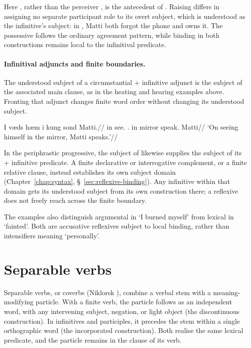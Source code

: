 Here , rather than the perceiver , is the antecedent of . Raising  differs in assigning no separate participant role to its overt subject, which is understood as the infinitive's subject: in , Matti both forgot the phone and owns it. The possessive follows the ordinary agreement pattern, while binding in both constructions remains local to the infinitival predicate.

\paragraph{Infinitival adjuncts and finite boundaries.}
The understood subject of a circumstantial  + infinitive adjunct is the subject of the associated main clause, as in the heating and hearing examples above. Fronting that adjunct changes finite word order without changing its understood subject.

\pex
\begingl
\gla I væds hæm i kung sond Matti.//
\glb in see.\Inf{} \Refl{}.\Acc{} in mirror speak.\Pres{} Matti//
\glft `On seeing himself in the mirror, Matti speaks.'//
\endgl
\xe

In the periphrastic progressive, the subject of  likewise supplies the subject of its  + infinitive predicate. A finite declarative or interrogative complement, or a finite relative clause, instead establishes its own subject domain (Chapter~\ref{chap:syntax}, \S~\ref{sec:reflexive-binding}). Any infinitive within that domain gets its understood subject from its own construction there; a reflexive does not freely reach across the finite boundary.

The examples also distinguish argumental  in  `I burned myself' from lexical  in  `fainted'. Both are accusative reflexives subject to local binding, rather than intensifiers meaning `personally'.

\section{Separable verbs}
\label{sec:separable-verbs}

Separable verbs, or coverbs (Niklorsk ), combine a verbal stem with a meaning-modifying particle. With a finite verb, the particle follows as an independent word, with any intervening subject, negation, or light object (the discontinuous construction). In infinitives and participles, it precedes the stem within a single orthographic word (the incorporated construction). Both realise the same lexical predicate, and the particle remains in the clause of its verb.

